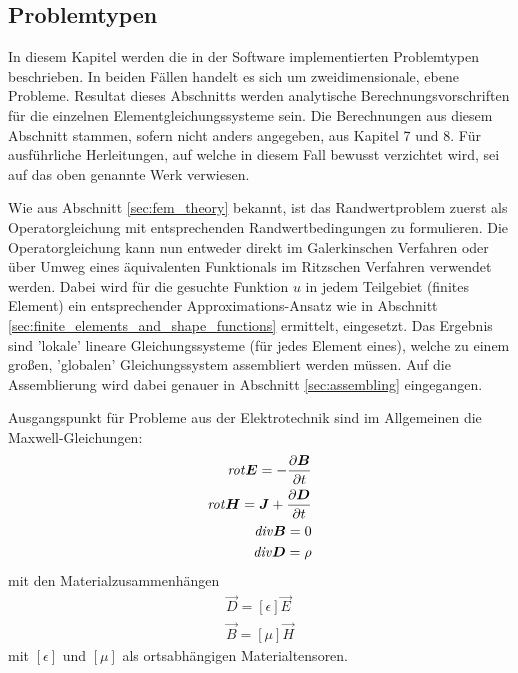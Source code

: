 \subsection{Problemtypen}
In diesem Kapitel werden die in der Software implementierten Problemtypen beschrieben. In beiden Fällen handelt es sich um zweidimensionale, ebene Probleme. Resultat dieses Abschnitts werden analytische Berechnungsvorschriften für die einzelnen Elementgleichungssysteme sein.\newline
Die Berechnungen aus diesem Abschnitt stammen, sofern nicht anders angegeben, aus \cite{SMS_VO_skript} Kapitel 7 und 8. Für ausführliche Herleitungen, auf welche in diesem Fall bewusst verzichtet wird, sei auf das oben genannte Werk verwiesen.\newline

Wie aus Abschnitt \ref{sec:fem_theory} bekannt, ist das Randwertproblem zuerst als Operatorgleichung mit entsprechenden Randwertbedingungen zu formulieren. Die Operatorgleichung kann nun entweder direkt im Galerkinschen Verfahren oder über Umweg eines äquivalenten Funktionals im Ritzschen Verfahren verwendet werden. Dabei wird für die gesuchte Funktion $u$ in jedem Teilgebiet (finites Element) ein entsprechender Approximations-Ansatz wie in Abschnitt \ref{sec:finite_elements_and_shape_functions} ermittelt, eingesetzt. Das Ergebnis sind 'lokale' lineare Gleichungssysteme (für jedes Element eines), welche zu einem großen, 'globalen' Gleichungssystem assembliert werden müssen. Auf die Assemblierung wird dabei genauer in Abschnitt \ref{sec:assembling} eingegangen.\newline

Ausgangspunkt für Probleme aus der Elektrotechnik sind im Allgemeinen die Maxwell-Gleichungen:
\begin{align}
	\mathit{rot}\boldsymbol{E} = -\frac{\partial \boldsymbol{B}}{\partial t} \label{eq:maxwell_1} \\
	\mathit{rot}\boldsymbol{H} = \boldsymbol{J} + \frac{\partial \boldsymbol{D}}{\partial t} \label{eq:maxwell_2}\\
	\mathit{div}\boldsymbol{B} = 0 \label{eq:maxwell_3}\\
	\mathit{div}\boldsymbol{D} = \rho \label{eq:maxwell_4}
\end{align}
mit den Materialzusammenhängen
\begin{align}
\vec{D} = [\epsilon]\vec{E} \label{eq:material_1}\\
\vec{B} = [\mu]\vec{H} \label{eq:material_2}
\end{align}
mit $[\epsilon]$ und $[\mu]$ als ortsabhängigen Materialtensoren.

